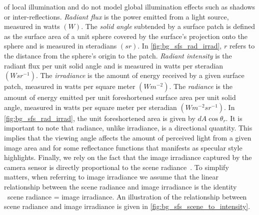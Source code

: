 of local illumination and do not model global illumination effects such
as shadows or inter-reflections.
\textit{Radiant flux} is the power emitted from a light source, measured in
watts $(W)$.
The \textit{solid angle} subtended by a surface patch is defined as the
surface area of a unit sphere covered by the surface's projection onto the
sphere and is measured in steradians $(sr)$. In \cref{fig:bg_sfs_rad_irrad},
$r$ refers to the distance from the sphere's origin to the patch.
\textit{Radiant intensity} is the radiant flux per unit solid angle and is
measured in watts per steradian $(W {sr}^{-1})$.
The \textit{irradiance} is the amount of energy received by a given surface
patch, measured in watts per square meter $(W m^{-2})$.
The \textit{radiance} is the amount of energy emitted per unit foreshortened
surface area per unit solid angle, measured in watts per square meter
per steradian $(W m^{-2} {sr}^{-1})$. In \cref{fig:bg_sfs_rad_irrad},
the unit foreshortened area is given by $dA \cos{\theta_r}$.
It is important to note that radiance, unlike irradiance, is a directional
quantity. This implies that the viewing angle affects the amount of perceived
light from a given image area and for some reflectance functions that manifests
as specular style highlights. Finally, we rely on the fact that the image
irradiance captured by the camera sensor is directly proportional to the
scene radiance~\cite{horn1979calculating}. To simplify matters, when referring
to image irradiance we assume that the linear relationship between the scene
radiance and image irradiance is the identity
\ie~scene radiance = image irradiance. An illustration of the relationship
between scene radiance and image irradiance is given in
\cref{fig:bg_sfs_scene_to_intensity}.

